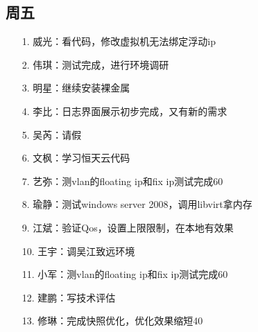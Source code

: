 \documentclass[a4paper,left=1.5cm,right=1.5cm,11pt]{article}
\begin{document}
\subsection{周五}
    \begin{itemize}
       \item[1.]威光：看代码，修改虚拟机无法绑定浮动ip
		\item[2.]伟琪：测试完成，进行环境调研
		\item[3.]明星：继续安装裸金属
		\item[4.]李比：日志界面展示初步完成，又有新的需求
		\item[5.]吴芮：请假
		\item[6.]文枫：学习恒天云代码
		\item[7.]艺弥：测vlan的floating ip和fix ip测试完成60%
		\item[8.]瑜静：测试windows server 2008，调用libvirt拿内存
		\item[9.]江斌：验证Qos，设置上限限制，在本地有效果
		\item[10.]王宇：调吴江致远环境
		\item[11.]小军：测vlan的floating ip和fix ip测试完成60%
		\item[12.]建鹏：写技术评估
		\item[13.]修琳：完成快照优化，优化效果缩短40%
    \end{itemize}
\end{document}
